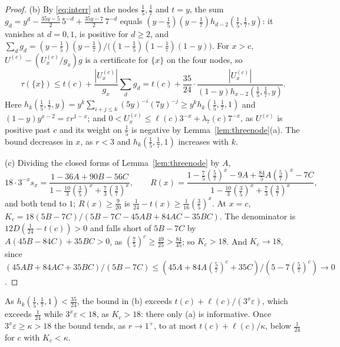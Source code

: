 \documentclass[11pt]{article}
\begin{document}
\begin{proof}
(b) By \eqref{eq:interr} at the nodes $\tfrac15,\tfrac17$ and $t=y$, the
sum $g_d=y^d-\tfrac{35y-5}2\,5^{-d}+\tfrac{35y-7}2\,7^{-d}$ equals
$(y-\tfrac15)(y-\tfrac17)h_{d-2}(\tfrac15,\tfrac17,y)$: it vanishes at
$d=0,1$, is positive for $d\ge2$, and
$\sum_dg_d=(y-\tfrac15)(y-\tfrac17)/\bigl((1-\tfrac15)(1-\tfrac17)(1-y)\bigr)$.
For $x>c$, $U^{(c)}-(U^{(c)}_x/g_x)g$ is a certificate for $\{x\}$ on the
four nodes, so
\[
  \tau(\{x\})\le t(c)+\frac{|U^{(c)}_x|}{g_x}\sum_dg_d
  =t(c)+\frac{35}{24}\cdot\frac{|U^{(c)}_x|}{(1-y)h_{x-2}(\tfrac15,\tfrac17,y)} .
\]
Here $h_k(\tfrac15,\tfrac17,y)=y^k\sum_{i+j\le k}(5y)^{-i}(7y)^{-j}\ge
y^kh_k(\tfrac15,\tfrac17,1)$ and $(1-y)y^{x-2}=\varepsilon r^{1-x}$;
and $0<U^{(c)}_x\le\ell(c)3^{-x}+\lambda_7(c)7^{-x}$, as $U^{(c)}$ is
positive past $c$ and its weight on $\tfrac15$ is negative by
Lemma~\ref{lem:threenode}(a).  The bound decreases in $x$, as $r<3$ and
$h_k(\tfrac15,\tfrac17,1)$ increases with $k$.

(c) Dividing the closed forms of Lemma~\ref{lem:threenode} by $A$,
\[
  18\cdot3^{-x}s_x=\frac{1-36A+90B-56C}{1-\tfrac{10}3(\tfrac35)^x+\tfrac73(\tfrac37)^x},
  \qquad
  R(x)=\frac{1-\tfrac75(\tfrac57)^x-9A+\tfrac{84}5A(\tfrac57)^x-7C}
  {1-\tfrac{10}3(\tfrac35)^x+\tfrac73(\tfrac37)^x},
\]
and both tend to $1$; $R(x)\ge\tfrac9{20}$ is
$\tfrac1{24}-t(x)\ge\tfrac1{16}(\tfrac35)^x$.  At $x=c$,
$K_c=18(5B-7C)/(5B-7C-45AB+84AC-35BC)$.  The denominator is
$12D(\tfrac1{24}-t(c))>0$ and falls short of $5B-7C$ by
$A(45B-84C)+35BC>0$, as $(\tfrac75)^c\ge\tfrac{49}{25}>\tfrac{84}{45}$; so
$K_c>18$.  And $K_c\to18$, since
$(45AB+84AC+35BC)/(5B-7C)\le(45A+84A(\tfrac57)^c+35C)/(5-7(\tfrac57)^c)\to0$.
\end{proof}

As $h_k(\tfrac15,\tfrac17,1)<\tfrac{35}{24}$, the bound in (b) exceeds
$t(c)+\ell(c)/(3^x\varepsilon)$, which exceeds $\tfrac1{24}$ while
$3^x\varepsilon<18$, as $K_c>18$: there only (a) is informative.  Once
$3^x\varepsilon\ge\kappa>18$ the bound tends, as $r\to1^+$, to at most
$t(c)+\ell(c)/\kappa$, below $\tfrac1{24}$ for $c$ with $K_c<\kappa$.
\end{document}
